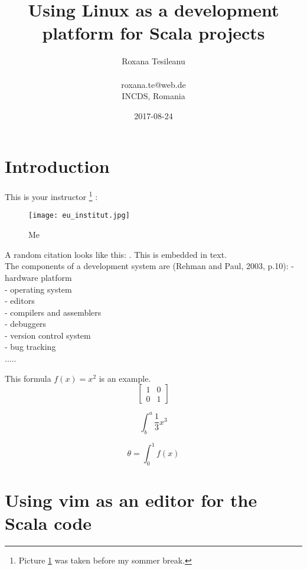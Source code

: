 \documentclass{article}
\title{Using Linux as a development platform for Scala projects}
\date{2017-08-24}
\author{Roxana Tesileanu \\ 
\\ 
roxana.te@web.de \\
INCDS, Romania }
\begin{document}
	\maketitle
	\newpage

\tableofcontents
\newpage

\section{Introduction}

This is your instructor \footnote{\label{footnote1}Picture \ref{fig: Roxi} was taken before my sommer break.} : 
\\
\begin{figure} [H]
 \texttt{[image: eu\_institut.jpg]}
 \caption{Me}
 \label{fig: Roxi}
\end{figure}


\newpage
A random citation looks like this:
\cite{odersky_programming_2010}. This is embedded in text. \\
The components of a development system are (Rehman and Paul, 2003, p.10):\newline
- hardware platform \\
- operating system \\
- editors \\
- compilers and assemblers \\
- debuggers \\
- version control system \\
- bug tracking \\

.....

This formula $f(x) = x^2$ is an example.
\begin{equation}
\left[
\begin{matrix}
1 & 0 \\
0 & 1
\end{matrix}
\right]
\end{equation}

\begin{equation}
\int^a_b\frac{1}{3}x^3
\end{equation}

\begin{equation}
\theta = \int^1_0 f(x)
\end{equation}



\section{Using vim as an editor for the Scala code}
\end{document}
